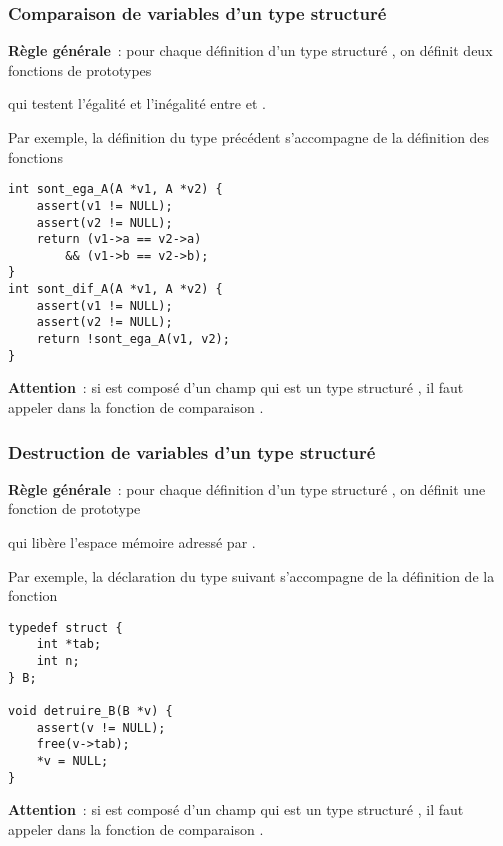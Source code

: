 \begin{frame}[fragile]
\frametitle{Comparaison de variables d'un type structuré}
{\bf Règle générale}~: pour chaque définition d'un type structuré ,
on définit deux fonctions de prototypes
\begin{center}
     \smallskip

\end{center}
qui \alert{testent l'égalité} et \alert{l'inégalité} entre 
et .
\medskip

Par exemple, la définition du type  précédent s'accompagne de la
définition des fonctions
\begin{multicols}{2}
\begin{lstlisting}
int sont_ega_A(A *v1, A *v2) {
    assert(v1 != NULL);
    assert(v2 != NULL);
    return (v1->a == v2->a)
        && (v1->b == v2->b);
}
int sont_dif_A(A *v1, A *v2) {
    assert(v1 != NULL);
    assert(v2 != NULL);
    return !sont_ega_A(v1, v2);
}
\end{lstlisting}
\end{multicols}
\medskip

{\bf Attention}~: si  est composé d'un champ qui est un type
structuré , il faut appeler dans  la
fonction de comparaison .
\end{frame}

\begin{frame}[fragile]
\frametitle{Destruction de variables d'un type structuré}
{\bf Règle générale}~: pour chaque définition d'un type structuré ,
on définit une fonction de prototype
\begin{center}
\end{center}
qui \alert{libère l'espace mémoire} adressé par .
\medskip

Par exemple, la déclaration du type  suivant s'accompagne de la
définition de la fonction
\begin{multicols}{2}
\begin{lstlisting}
typedef struct {
    int *tab;
    int n;
} B;

void detruire_B(B *v) {
    assert(v != NULL);
    free(v->tab);
    *v = NULL;
}
\end{lstlisting}
\end{multicols}
\medskip

{\bf Attention}~: si  est composé d'un champ qui est un type
structuré , il faut appeler dans  la
fonction de comparaison .
\end{frame}

